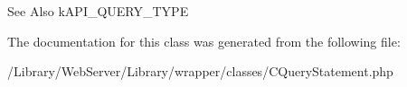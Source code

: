 \begin{DoxySeeAlso}{See Also}
k\-A\-P\-I\-\_\-\-Q\-U\-E\-R\-Y\-\_\-\-T\-Y\-P\-E 
\end{DoxySeeAlso}


The documentation for this class was generated from the following file\-:\begin{DoxyCompactItemize}
\item 
/\-Library/\-Web\-Server/\-Library/wrapper/classes/C\-Query\-Statement.\-php\end{DoxyCompactItemize}
